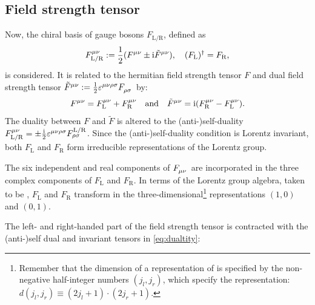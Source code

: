 \subsection{Field strength tensor} \label{sec:fieldstrengthtensor}
Now, the chiral basis of gauge bosons $ F_{\mathrm{L}/ \mathrm{R}} $, defined as
\begin{equation}
	\begin{aligned}
		F_{\mathrm{L}/\mathrm{R}}^{\mu \nu} := \frac{1}{2} (F^{\mu \nu} \pm \mathrm{i} \tilde{F}^{\mu \nu}) , \quad
		(F_{\mathrm{L}})^{\dagger} = F_{\mathrm{R}}
		\text{,}
	\end{aligned}
\end{equation}
is considered.
It is related to the hermitian field strength tensor $ F $ and dual field strength tensor $ \tensor{\tilde{F}}{^{\mu \nu}} := \frac{1}{2} \tensor{\eps}{^{\mu \nu \rho \sigma}} \tensor{F}{_{\rho \sigma}} $ by:
\begin{equation}
	\begin{aligned}
		F^{\mu \nu} = F_{\mathrm{L}}^{\mu \nu} + F_{\mathrm{R}}^{\mu \nu}
		\quad \text{and} \quad
		\tilde{F}^{\mu \nu} = \mathrm{i} (F_{\mathrm{R}}^{\mu \nu} - F_{\mathrm{L}}^{\mu \nu})
		\text{.}
	\end{aligned}
\end{equation}
The duality between $ F $ and $ \tilde{F} $ is altered to the (anti-)self-duality $ F_{\mathrm{L}/\mathrm{R}}^{\mu \nu} = \pm \frac{\mi}{2} \tensor{\eps}{^{\mu \nu \rho \sigma}} F^{\mathrm{L}/\mathrm{R}}_{\rho \sigma} $.
Since the (anti-)self-duality condition is Lorentz invariant, both $ F_{\mathrm{L}} $ and $ F_{\mathrm{R}} $ form irreducible representations of the Lorentz group.\par
%
The six independent and real components of $ \tensor{F}{_{\mu \nu}} $ are incorporated in the three complex components of $ F_{\mathrm{L}} $ and $ F_{\mathrm{R}} $. In terms of the Lorentz group algebra, taken to be \susu{}, $ F_{\mathrm{L}} $ and $ F_{\mathrm{R}} $ transform in the three-dimensional\footnote{Remember that the dimension of a representation of \susu{} is specified by the non-negative half-integer numbers $ (j_{l}, j_{r}) $, which specify the representation: $ d(j_{l}, j_{r}) \equiv (2 j_{l} + 1) \cdot (2 j_{r} + 1) $.} representations $ (1, 0) $ and $ (0, 1) $.
\par
%
The left- and right-handed part of the field strength tensor is contracted with the (anti-)self dual and invariant tensors in \cref{eq:dualtity}:
